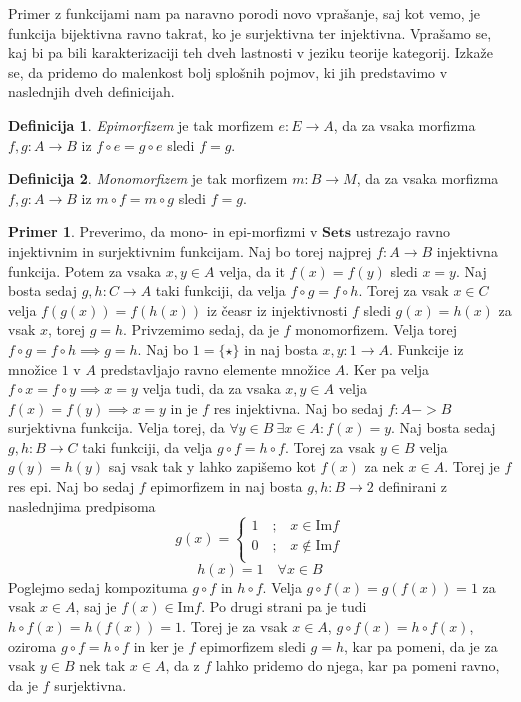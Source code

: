 \documentclass[12pt,a4paper]{book}
\theoremstyle{definition}
\newtheorem{definicija}{Definicija}[chapter]
\theoremstyle{plain}
\theoremstyle{definition}
\newtheorem{primer}{Primer}[section]
\theoremstyle{remark}
\newcommand{\cat}[1]{\textbf{#1}}
\begin{document}
Primer z funkcijami nam pa naravno porodi novo vprašanje, saj kot vemo, je funkcija bijektivna ravno takrat, ko je surjektivna ter injektivna. Vprašamo se, kaj bi pa bili karakterizaciji teh dveh lastnosti v jeziku teorije kategorij. Izkaže se, da pridemo do malenkost bolj splošnih pojmov, ki jih predstavimo v naslednjih dveh definicijah.

\begin{definicija}
\emph{Epimorfizem} je tak morfizem $e : E \to A$, da za vsaka morfizma $f,g : A \to B$ iz $f \circ e = g \circ e$ sledi $f = g$.
\end{definicija}

\begin{definicija}
\emph{Monomorfizem} je tak morfizem $m : B \to M$, da za vsaka morfizma $f,g : A \to B$ iz $m \circ f = m \circ g$ sledi $f = g$.
\end{definicija}

\begin{primer}
Preverimo, da mono- in epi-morfizmi v $\cat{Sets}$ ustrezajo ravno injektivnim in surjektivnim funkcijam. Naj bo torej najprej $f : A \to B$ injektivna funkcija. Potem za vsaka $x,y \in A$ velja, da it $f(x) = f(y)$ sledi $x = y$. Naj bosta sedaj $g,h : C \to A$ taki funkciji, da velja $f \circ g = f \circ h$. Torej za vsak $x \in C$ velja $f(g(x)) = f(h(x))$ iz čeasr iz injektivnosti $f$ sledi $g(x) = h(x)$ za vsak $x$, torej $g = h$. Privzemimo sedaj, da je $f$ monomorfizem. Velja torej $f \circ g = f \circ h \implies g = h$. Naj bo $1 = \{\star\}$ in naj bosta $x,y : 1 \to A$. Funkcije iz množice $1$ v $A$ predstavljajo ravno elemente množice $A$. Ker pa velja $f \circ x = f \circ y \implies x = y$ velja tudi, da za vsaka $x,y \in A$ velja $f(x) = f(y) \implies x = y$ in je $f$ res injektivna. Naj bo sedaj $f : A -> B$ surjektivna funkcija. Velja torej, da $\forall y \in B \ \exists x \in A : f(x) = y$. Naj bosta sedaj $g,h : B \to C$ taki funkciji, da velja $g \circ f = h \circ f$. Torej za vsak $y \in B$ velja $g(y) = h(y)$ saj vsak tak y lahko zapišemo kot $f(x)$ za nek $x \in A$. Torej je $f$ res epi. Naj bo sedaj $f$ epimorfizem in naj bosta $g,h : B \to 2$ definirani z naslednjima predpisoma
\[
g(x)=
\begin{cases}
1 \quad\text{;}\quad x \in \mathrm{Im}f \\
0 \quad\text{;}\quad x \notin \mathrm{Im}f \\
\end{cases}
\]
$$ h(x) = 1 \quad \forall x \in B $$
Poglejmo sedaj kompozituma $g \circ f$ in $h \circ f$. Velja $g \circ f(x) = g(f(x)) = 1$ za vsak $x \in A$, saj je $f(x) \in \mathrm{Im}f$. Po drugi strani pa je tudi $h \circ f(x) = h(f(x)) = 1$. Torej je za vsak $x \in A$, $g \circ f(x) = h \circ f(x)$, oziroma $g\circ f = h\circ f$ in ker je $f$ epimorfizem sledi $g = h$, kar pa pomeni, da je za vsak $y \in B$ nek tak $x \in A$, da z $f$ lahko pridemo do njega, kar pa pomeni ravno, da je $f$ surjektivna.
\end{primer}
\end{document}
